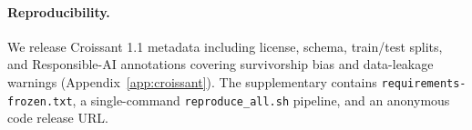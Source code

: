 \paragraph{Reproducibility.}
We release Croissant 1.1 metadata \citep{Akhtar2024Croissant} including
license, schema, train/test splits, and Responsible-AI annotations
covering survivorship bias and data-leakage warnings
(Appendix~\ref{app:croissant}). The supplementary contains
\texttt{requirements-frozen.txt}, a single-command \texttt{reproduce\_all.sh}
pipeline, and an anonymous code release URL.
